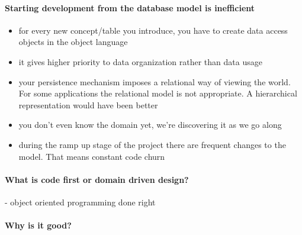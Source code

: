 \documentclass{article}
\begin{document}
\paragraph{Starting development from the database model is inefficient}
\begin{itemize} 
\item for every new concept/table you introduce, you have to create
  data access objects in the object language

\item it gives higher priority to data organization rather than data
  usage
\item your persistence mechanism imposes a relational way of viewing
  the world. For some applications the relational model is not
  appropriate. A hierarchical representation would have been better

\item you don't even know the domain yet, we're discovering it as we
  go along
\item during the ramp up stage of the project there are frequent
  changes to the model. That means constant code churn
\end{itemize}

\paragraph{What is code first or domain driven design?}
- object oriented programming done right

\paragraph{Why is it good?}
\end{document}
